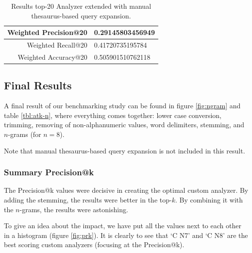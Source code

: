 \documentclass[11pt]{article}
\begin{document}
\begin{table}[htp]
	\centering
	\begin{tabular}{|r|l|}
		\hline
		Weighted \textsf{Precision@20} & 0.29145803456949 \\ \hline
		Weighted \textsf{Recall@20} & 0.41720735195784 \\ \hline
		Weighted \textsf{Accuracy@20} & 0.505901510762118 \\ \hline
	\end{tabular}
	\caption{Results top-20 Analyzer extended with manual thesaurus-based query expansion.}
	\label{tbl:atk-ns}
\end{table}


\subsection{Final Results}
A final result of our benchmarking study can be found in figure \ref{fig:ngram} and table \ref{tbl:atk-n}, where everything comes together: lower case conversion, trimming, removing of non-alphanumeric values, word delimiters, stemming, and $n$-grams (for $n=8$).

Note that manual thesaurus-based query expansion is not included in this result.

\subsubsection{Summary \textsf{Precision@k}}
The \textsf{Precision@k} values were decisive in creating the optimal custom analyzer. By adding the stemming, the results were better in the top-$k$. By combining it with the $n$-grams, the results were astonishing. 

To give an idea about the impact, we have put all the values next to each other in a histogram (figure \ref{fig:prk}). It is clearly to see that `C N7' and `C N8' are the best scoring custom analyzers (focusing at the \textsf{Precision@k}).
\end{document}
